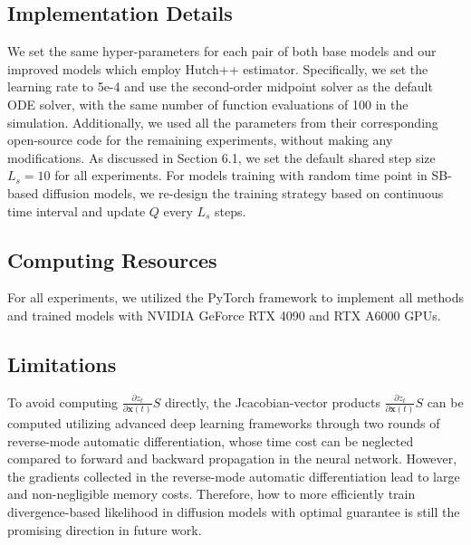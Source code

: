 \begin{table}[!h]
    \centering
    \caption{\small Overview of the datasets used in time series forecasting}
    \label{tab: time_stat}
\end{table}

\subsection{Implementation Details}
We set the same hyper-parameters for each pair of both base models and our improved models which employ Hutch++ estimator.
Specifically, we set the learning rate to 5e-4 and use the second-order midpoint solver as the default ODE solver, with the same number of function evaluations of 100 in the simulation.
Additionally, we used all the parameters from their corresponding open-source code for the remaining experiments, without making any modifications.
As discussed in Section 6.1, we set the default shared step size $L_s = 10$ for all experiments. For models training with random time point in SB-based diffusion models, we re-design the training strategy based on continuous time interval and update $Q$ every $L_s$ steps.

\subsection{Computing Resources}
For all experiments, we utilized the PyTorch \citep{paszke2019pytorch} framework to implement all methods and trained models with NVIDIA GeForce RTX 4090 and RTX A6000 GPUs.

\subsection{Limitations}
To avoid computing $\frac{\partial z_t}{\partial \mathbf{x}(t)} S$ directly, 
the Jcacobian-vector products  $\frac{\partial z_t}{\partial \mathbf{x}(t)} S$ can be computed utilizing advanced deep learning frameworks through two rounds of reverse-mode automatic differentiation, whose time cost can be neglected compared to forward and backward propagation in the neural network.
However, the gradients collected in the reverse-mode automatic differentiation lead to large and non-negligible memory costs.
Therefore, how to more efficiently train divergence-based likelihood in diffusion models with optimal guarantee is still the promising direction in future work.

